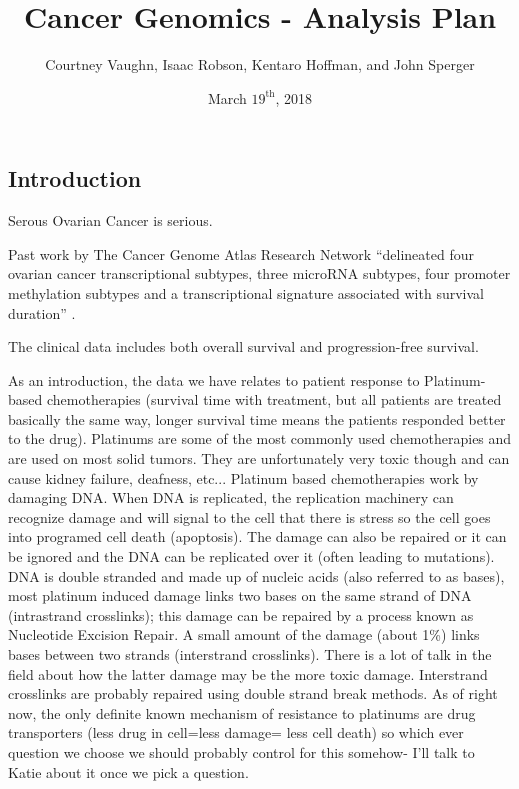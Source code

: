 \documentclass{article}
\author{
Courtney Vaughn, Isaac Robson, Kentaro Hoffman, and John Sperger
}
\title{Cancer Genomics - Analysis Plan}
\date{March $19^{\mathrm{th}}$, 2018}
\begin{document}
\maketitle


\subsection{Introduction}

Serous Ovarian Cancer is serious. 

Past work by The Cancer Genome Atlas Research Network ``delineated four ovarian cancer transcriptional subtypes, three microRNA subtypes, four promoter methylation subtypes and a transcriptional
signature associated with survival duration'' \cite{cancer2011integrated}.

The clinical data includes both overall survival and progression-free survival. 

As an introduction, the data we have relates to patient response to Platinum-based chemotherapies (survival time with treatment, but all patients are treated basically the same way, longer survival time means the patients responded better to the drug). Platinums are some of the most commonly used chemotherapies and are used on most solid tumors.  They are unfortunately very toxic though and can cause kidney failure, deafness, etc... Platinum based chemotherapies work by damaging DNA. When DNA is replicated, the replication machinery can recognize damage and will signal to the cell that there is stress so the cell goes into programed cell death (apoptosis).  The damage can also be repaired or it can be ignored and the DNA can be replicated over it (often leading to mutations).  DNA is double stranded and made up of nucleic acids (also referred to as bases), most platinum induced damage links two bases on the same strand of DNA (intrastrand crosslinks); this damage can be repaired by a process known as Nucleotide Excision Repair. A small amount of the damage (about 1\%) links bases between two strands (interstrand crosslinks). There is a lot of talk in the field about how the latter damage may be the more toxic damage.  Interstrand crosslinks are probably repaired using double strand break methods.  As of right now, the only definite known mechanism of resistance to platinums are drug transporters (less drug in cell=less damage= less cell death) so which ever question we choose we should probably control for this somehow- I'll talk to Katie about it once we pick a question.
\end{document}
